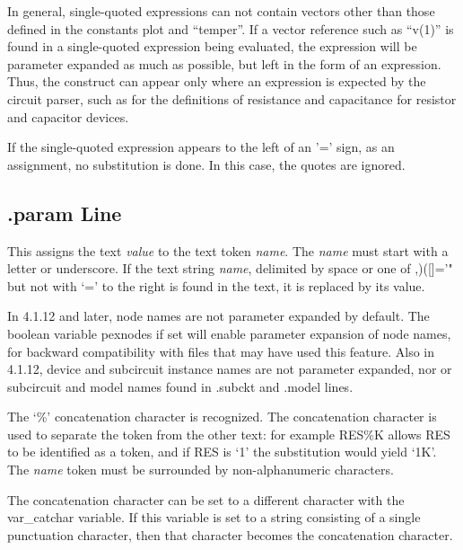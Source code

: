 In general, single-quoted expressions can not contain vectors other
than those defined in the constants plot and ``{\vt temper}''.  If a
vector reference such as ``{\vt v(1)}'' is found in a single-quoted
expression being evaluated, the expression will be parameter expanded
as much as possible, but left in the form of an expression.  Thus, the
construct can appear only where an expression is expected by the
circuit parser, such as for the definitions of resistance and
capacitance for resistor and capacitor devices.

If the single-quoted expression appears to the left of an '=' sign, as
an assignment, no substitution is done.  In this case, the quotes are
ignored.

\subsection{{\vt .param} Line}


This assigns the text {\it value} to the text token {\it name}.  The
{\it name} must start with a letter or underscore.  If the text string
{\it name}, delimited by space or one of {\vt ,)([]='"} but not with
`{\vt =}' to the right is found in the text, it is replaced by its
value. 

In 4.1.12 and later, node names are not parameter expanded by default. 
The boolean variable {\et pexnodes} if set will enable parameter
expansion of node names, for backward compatibility with files that
may have used this feature.  Also in 4.1.12, device and subcircuit
instance names are not parameter expanded, nor or subcircuit and model
names found in {\vt .subckt} and {\vt .model} lines.

The `{\vt \%}' concatenation character is recognized.  The
concatenation character is used to separate the token from the other
text:  for example {\vt RES\%K} allows {\vt RES} to be identified as a
token, and if {\vt RES} is `1' the substitution would yield `1K'.  The
{\it name} token must be surrounded by non-alphanumeric characters.

The concatenation character can be set to a different character with
the {\et var\_catchar} variable.  If this variable is set to a string
consisting of a single punctuation character, then that character
becomes the concatenation character.

